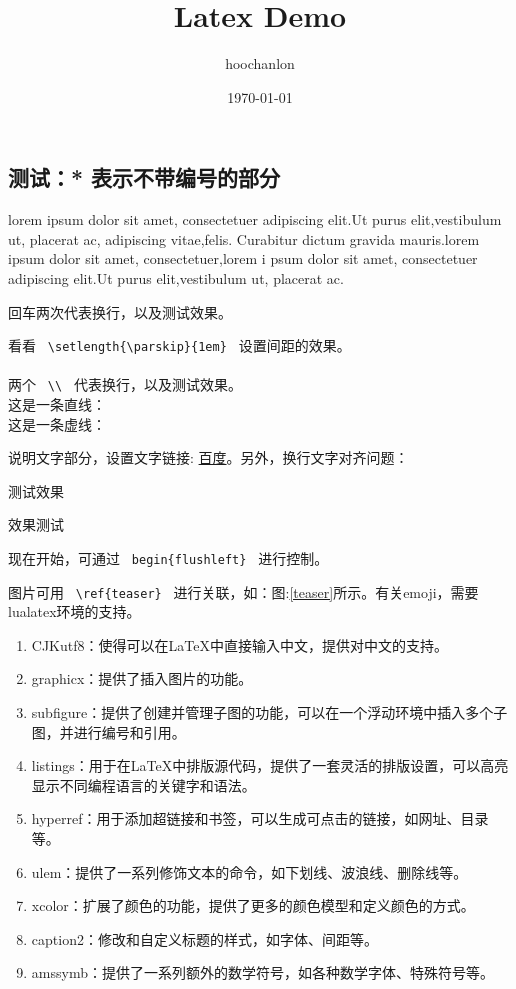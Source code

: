\documentclass{article}
\title{Latex Demo}
\author{hoochanlon}
\date{\today}
\begin{document}
	\begin{CJK*}{UTF8}{gbsn}
		\maketitle
		\tableofcontents

		\clearpage
		\section*{测试：* 表示不带编号的部分}
		lorem ipsum dolor sit amet, consectetuer adipiscing elit.Ut purus elit,vestibulum ut, placerat ac,
		adipiscing vitae,felis. Curabitur dictum gravida mauris.lorem ipsum dolor sit amet, consectetuer,lorem i
		psum dolor sit amet, consectetuer adipiscing elit.Ut purus elit,vestibulum ut, placerat ac.

		回车两次代表换行，以及测试效果。
		\setlength{\parskip}{1em}

		看看 \verb| \setlength{\parskip}{1em} | 设置间距的效果。\\ \\
		两个 \verb| \\ | 代表换行，以及测试效果。 \\
		这是一条直线：\hrulefill \\
		这是一条虚线：\dotfill

		说明文字部分，设置文字链接: \href{http://www.baidu.com/}{百度}。另外，换行文字对齐问题：

		测试效果 \par
		效果测试\par

		\begin{flushleft}
		现在开始，可通过 \verb| begin{flushleft} | 进行控制。 \par
		图片可用 \verb| \ref{teaser} | 进行关联，如：图:\ref{teaser}所示。有关emoji，需要lualatex环境的支持。

		\begin{enumerate}
			\item CJKutf8：使得可以在LaTeX中直接输入中文，提供对中文的支持。
			\item graphicx：提供了插入图片的功能。
			\item subfigure：提供了创建并管理子图的功能，可以在一个浮动环境中插入多个子图，并进行编号和引用。
			\item listings：用于在LaTeX中排版源代码，提供了一套灵活的排版设置，可以高亮显示不同编程语言的关键字和语法。
			\item hyperref：用于添加超链接和书签，可以生成可点击的链接，如网址、目录等。
			\item ulem：提供了一系列修饰文本的命令，如下划线、波浪线、删除线等。
			\item xcolor：扩展了颜色的功能，提供了更多的颜色模型和定义颜色的方式。
			\item caption2：修改和自定义标题的样式，如字体、间距等。
			\item amssymb：提供了一系列额外的数学符号，如各种数学字体、特殊符号等。
		\end{enumerate}


\end{flushleft}
\end{CJK*}
\end{document}
